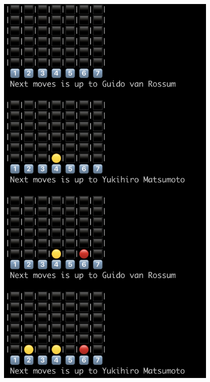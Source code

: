 \documentclass[handout]{beamer}
\begin{document}
  \begin{frame}
    \begin{columns}
        \centering
        \includegraphics[width=0.8\textwidth]{img/gamestart.png}
        \centering

\end{columns}
\end{frame}
\end{document}
